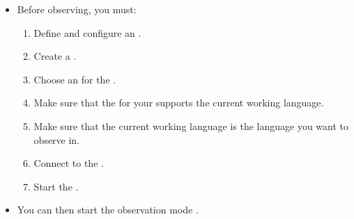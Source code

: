% 
%
%
\label{observeprereq}
\begin{itemize}
\item Before observing, you must:
\begin{enumerate}
\item Define and configure an \gdaut{} .
\item Create a \gdsuite{} .
\item Choose an \gdaut{} for the \gdsuite{} .
\item Make sure that the \gdaut{} for your \gdsuite{} supports the current working language.
\item Make sure that the current working language is the language you want to observe in.
\item Connect to the \gdserver{} .
\item Start the \gdaut{} .
\end{enumerate}
\item You can then start the observation mode .
\end{itemize}







